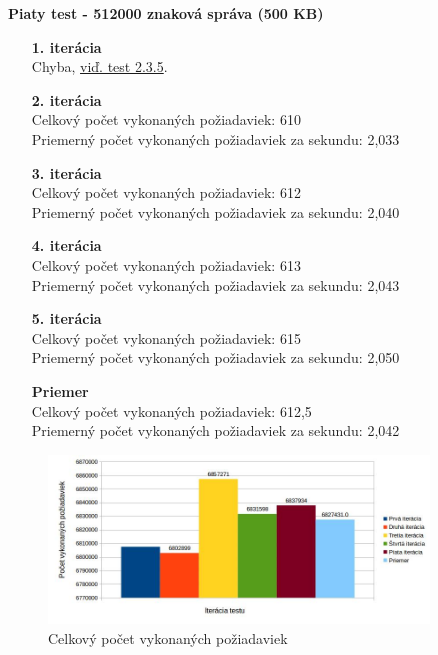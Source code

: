 \documentclass[12pt,oneside,final]{fithesis-utf8}
\begin{document}
\begin{itemize}
\textbf{Piaty test - 512000 znaková správa (500 KB)}
\begin{itemize}

\item[\textbf{1. iterácia}]\ \\
Chyba, \hyperlink{label}{viď. test 2.3.5}.

\item[\textbf{2. iterácia}]\ \\
Celkový počet vykonaných požiadaviek: 610\\
Priemerný počet vykonaných požiadaviek za sekundu: 2,033

\item[\textbf{3. iterácia}]\ \\
Celkový počet vykonaných požiadaviek: 612\\
Priemerný počet vykonaných požiadaviek za sekundu: 2,040

\item[\textbf{4. iterácia}]\ \\
Celkový počet vykonaných požiadaviek: 613\\
Priemerný počet vykonaných požiadaviek za sekundu: 2,043

\item[\textbf{5. iterácia}]\ \\
Celkový počet vykonaných požiadaviek: 615\\
Priemerný počet vykonaných požiadaviek za sekundu: 2,050

\item[\textbf{Priemer}]\ \\
Celkový počet vykonaných požiadaviek: 612,5\\
Priemerný počet vykonaných požiadaviek za sekundu: 2,042

\end{itemize}

\begin{figure}[H]
  \centering
      \includegraphics[width=0.9\textwidth]{faban3_5.jpg}
  \caption{Celkový počet vykonaných požiadaviek}
\end{figure}


\end{itemize}
\end{document}
